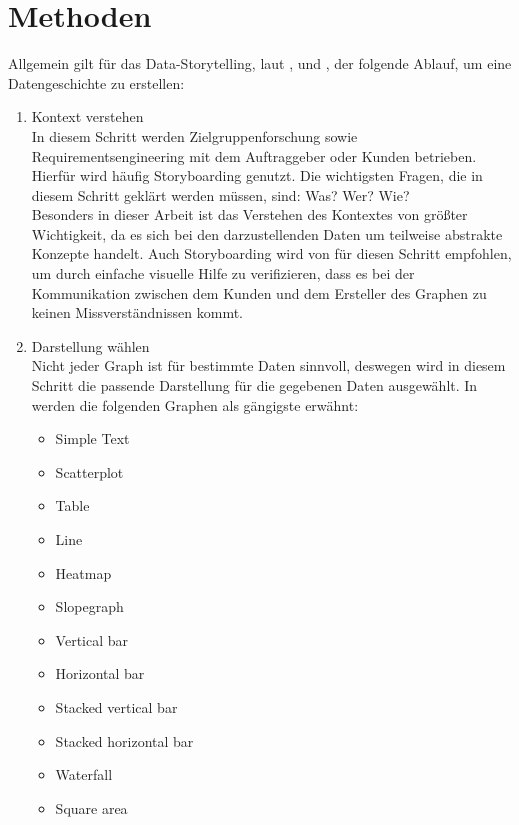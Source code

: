\section{Methoden}\label{sec:methoden}
Allgemein gilt für das Data-Storytelling, laut \cite{Prof.Dr.ChristianBeecks.}, \cite{TalksatGoogle.2015} und \cite{Knaflic.2016}, der folgende Ablauf, um eine Datengeschichte zu erstellen:
\begin{enumerate}
    \item Kontext verstehen\hfill\\ In diesem Schritt werden Zielgruppenforschung sowie Requirementsengineering mit dem Auftraggeber oder Kunden betrieben. Hierfür wird häufig Storyboarding genutzt. Die wichtigsten Fragen, die in diesem Schritt geklärt werden müssen, sind: Was? Wer? Wie?\\ Besonders in dieser Arbeit ist das Verstehen des Kontextes von größter Wichtigkeit, da es sich bei den darzustellenden Daten um teilweise abstrakte Konzepte handelt. Auch Storyboarding wird von \cite{Knaflic.2016} für diesen Schritt empfohlen, um durch einfache visuelle Hilfe zu verifizieren, dass es bei der Kommunikation zwischen dem Kunden und dem Ersteller des Graphen zu keinen Missverständnissen kommt.\\
    \item Darstellung wählen\hfill\\ Nicht jeder Graph ist für bestimmte Daten sinnvoll, deswegen wird in diesem Schritt die passende Darstellung für die gegebenen Daten ausgewählt. In \cite{Knaflic.2016} werden die folgenden Graphen als gängigste erwähnt:
    \begin{multicols}{2}
    \begin{itemize}
        \item Simple Text
        \item Scatterplot
        \item Table
        \item Line
        \item Heatmap
        \item Slopegraph
        \item Vertical bar
        \item Horizontal bar
        \item Stacked vertical bar
        \item Stacked horizontal bar
        \item Waterfall
        \item Square area
    \end{itemize}

\end{multicols}
\end{enumerate}
